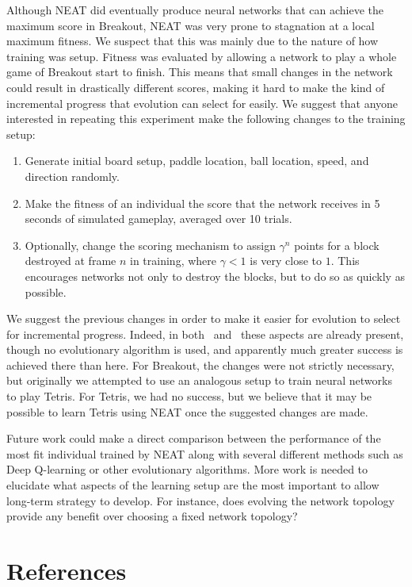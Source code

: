 \documentclass[letterpaper, twocolumn, conference]{article}
\begin{document}
Although NEAT did eventually produce neural networks that can achieve the maximum score
in Breakout, NEAT was very prone to stagnation at a local maximum fitness.
We suspect that this was mainly due to the nature of how training was setup.
Fitness was evaluated by allowing a network to play a whole game of Breakout start to finish.
This means that small changes in the network could result in drastically different scores, making it hard
to make the kind of incremental progress that evolution can select for easily.
We suggest that anyone interested in repeating this experiment make the following changes to
the training setup:
\begin{enumerate}
    \item{} Generate initial board setup, paddle location, ball location, speed, and direction randomly.
    \item{} Make the fitness of an individual the score that the network receives in 5 seconds of simulated gameplay, averaged over 10 trials.
    \item{} Optionally, change the scoring mechanism to assign $\gamma^n$ points for a block destroyed
        at frame $n$ in training, where $\gamma<1$ is very close to $1$. 
        This encourages networks not only to destroy the blocks, but to do so as quickly as possible.
\end{enumerate}

We suggest the previous changes in order to make it easier for evolution to select for incremental progress.
Indeed, in both~\cite{mnih2013playing} and~\cite{mnih2015human} these aspects are already present,
though no evolutionary algorithm is used, and apparently much greater success is achieved there than here.
For Breakout, the changes were not strictly necessary, but originally we attempted to use an analogous
setup to train neural networks to play Tetris.
For Tetris, we had no success, but we believe that it may be possible to learn Tetris using NEAT
once the suggested changes are made.

Future work could make a direct comparison between the performance of the most fit individual trained by
NEAT along with several different methods such as Deep Q-learning or other evolutionary algorithms.
More work is needed to elucidate what aspects of the learning setup are the most important to allow
long-term strategy to develop. For instance, does evolving the network topology provide any benefit over
choosing a fixed network topology?

\begingroup
    \section{References}
    \renewcommand{\section}[2]{}
    
    
\endgroup
\end{document}
